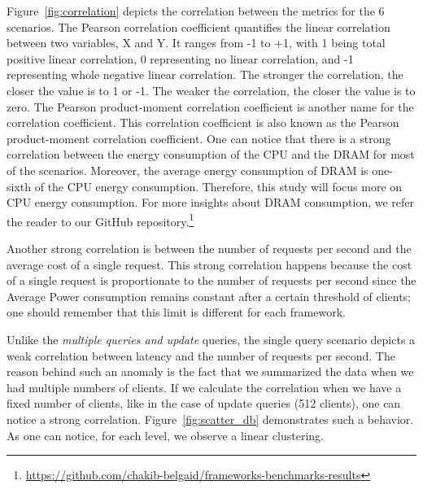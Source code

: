 Figure~\ref{fig:correlation} depicts the correlation between the metrics for the 6 scenarios.
The Pearson correlation coefficient quantifies the linear correlation between two variables, X and Y.
It ranges from -1 to +1, with 1 being total positive linear correlation, 0 representing no linear correlation, and -1 representing whole negative linear correlation.
The stronger the correlation, the closer the value is to 1 or -1.
The weaker the correlation, the closer the value is to zero.
The Pearson product-moment correlation coefficient is another name for the correlation coefficient.
This correlation coefficient is also known as the Pearson product-moment correlation coefficient.
One can notice that there is a strong correlation between the energy consumption of the CPU and the DRAM for most of the scenarios.
Moreover, the average energy consumption of DRAM is one-sixth of the CPU energy consumption.
Therefore, this study will focus more on CPU energy consumption.
For more insights about DRAM consumption, we refer the reader to our GitHub repository.\footnote{\url{https://github.com/chakib-belgaid/frameworks-benchmarks-results}}

Another strong correlation is between the number of requests per second and the average cost of a single request.
This strong correlation happens because the cost of a single request is proportionate to the number of requests per second since the Average Power consumption remains constant after a certain threshold of clients; one should remember that this limit is different for each framework.

Unlike the \emph{multiple queries and update} queries, the single query scenario depicts a weak correlation between latency and the number of requests per second.
The reason behind such an anomaly is the fact that we summarized the data when we had multiple numbers of clients.
If we calculate the correlation when we have a fixed number of clients, like in the case of update queries (512 clients), one can notice a strong correlation. Figure~\ref{fig:scatter_db} demonstrates such a behavior. As one can notice, for each level, we observe a linear clustering.

